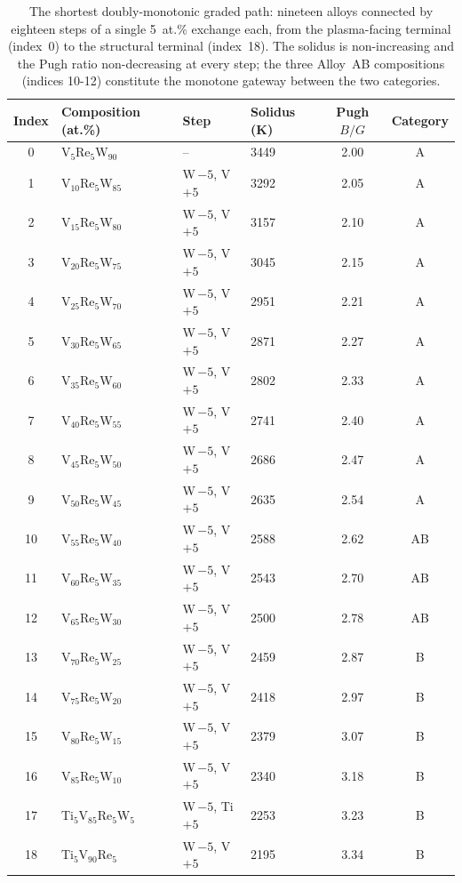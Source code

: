 \begin{table}[!t]
\centering
\caption{The shortest doubly-monotonic graded path: nineteen alloys connected by
eighteen steps of a single 5~at.\% exchange each, from the plasma-facing terminal
(index~0) to the structural terminal (index~18). The solidus is non-increasing
and the Pugh ratio non-decreasing at every step; the three Alloy~AB compositions
(indices 10-12) constitute the monotone gateway between the two categories.}
\label{tab:path}
\begin{tabular}{clllcc}
\toprule
Index & Composition (at.\%) & Step & Solidus (K) & Pugh $B/G$ & Category \\
\midrule
0 & V$_{5}$Re$_{5}$W$_{90}$ & -- & 3449 & 2.00 & A \\
1 & V$_{10}$Re$_{5}$W$_{85}$ & W\,$-5$, V\,$+5$ & 3292 & 2.05 & A \\
2 & V$_{15}$Re$_{5}$W$_{80}$ & W\,$-5$, V\,$+5$ & 3157 & 2.10 & A \\
3 & V$_{20}$Re$_{5}$W$_{75}$ & W\,$-5$, V\,$+5$ & 3045 & 2.15 & A \\
4 & V$_{25}$Re$_{5}$W$_{70}$ & W\,$-5$, V\,$+5$ & 2951 & 2.21 & A \\
5 & V$_{30}$Re$_{5}$W$_{65}$ & W\,$-5$, V\,$+5$ & 2871 & 2.27 & A \\
6 & V$_{35}$Re$_{5}$W$_{60}$ & W\,$-5$, V\,$+5$ & 2802 & 2.33 & A \\
7 & V$_{40}$Re$_{5}$W$_{55}$ & W\,$-5$, V\,$+5$ & 2741 & 2.40 & A \\
8 & V$_{45}$Re$_{5}$W$_{50}$ & W\,$-5$, V\,$+5$ & 2686 & 2.47 & A \\
9 & V$_{50}$Re$_{5}$W$_{45}$ & W\,$-5$, V\,$+5$ & 2635 & 2.54 & A \\
10 & V$_{55}$Re$_{5}$W$_{40}$ & W\,$-5$, V\,$+5$ & 2588 & 2.62 & AB \\
11 & V$_{60}$Re$_{5}$W$_{35}$ & W\,$-5$, V\,$+5$ & 2543 & 2.70 & AB \\
12 & V$_{65}$Re$_{5}$W$_{30}$ & W\,$-5$, V\,$+5$ & 2500 & 2.78 & AB \\
13 & V$_{70}$Re$_{5}$W$_{25}$ & W\,$-5$, V\,$+5$ & 2459 & 2.87 & B \\
14 & V$_{75}$Re$_{5}$W$_{20}$ & W\,$-5$, V\,$+5$ & 2418 & 2.97 & B \\
15 & V$_{80}$Re$_{5}$W$_{15}$ & W\,$-5$, V\,$+5$ & 2379 & 3.07 & B \\
16 & V$_{85}$Re$_{5}$W$_{10}$ & W\,$-5$, V\,$+5$ & 2340 & 3.18 & B \\
17 & Ti$_{5}$V$_{85}$Re$_{5}$W$_{5}$ & W\,$-5$, Ti\,$+5$ & 2253 & 3.23 & B \\
18 & Ti$_{5}$V$_{90}$Re$_{5}$ & W\,$-5$, V\,$+5$ & 2195 & 3.34 & B \\
\bottomrule
\end{tabular}
\end{table}



